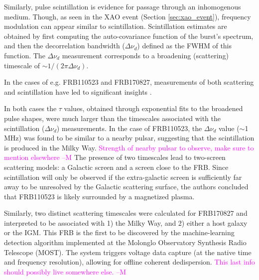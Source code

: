 \documentclass[a4paper,fleqn,usenatbib]{mnras}
\newcommand{\cM}[1]{\textcolor{magenta}{ #1 --M}}
\begin{document}
Similarly, pulse scintillation is evidence for passage through an inhomogenous medium. Though, as seen
in the XAO event (Section \ref{sec:xao_event}), frequency modulation can appear similar to scintillation. Scintillation estimates are obtained by first computing the auto-covariance function of the burst's spectrum, and then the  decorrelation bandwidth ($\Delta \nu_d$) defined as the FWHM of this function. The $\Delta \nu_d$ measurement corresponds to a broadening (scattering) timescale of $\sim 1/(2\pi\Delta \nu_d)$.

In the cases of e.g. FRB110523 and FRB170827, measurements of both scattering and scintillation have led to significant insights \citep{2015Natur.528..523M,2018arXiv180305697F}. 

In both cases the $\tau$ values, obtained through exponential fits to the broadened pulse shapes, were much larger than the timescales associated with the scintillation ($\Delta\nu_d$) measurements. In the case of FRB110523, the $\Delta\nu_d$ value ($\sim$1 MHz) was found to be similar to a nearby pulsar, suggesting that the scintillation is produced in the Milky Way. \cM{Strength of nearby pulsar to observe, make sure to mention elsewhere} The presence of two timescales lead to two-screen scattering models: a Galactic screen and a screen close to the FRB. Since scintillation will only be observed if the extra-galactic screen is sufficiently far away to be unresolved by the Galactic scattering surface, the authors concluded that FRB110523 is likely surrounded by a magnetized plasma. 

Similarly, two distinct scattering timescales were calculated for FRB170827 and interpreted to be associated with 1) the Milky Way, and 2) either a host galaxy or the IGM. This FRB is the first to be discovered by the machine-learning detection algorithm implemented at the Molonglo Observatory Synthesis Radio Telescope (MOST). The system triggers voltage data capture (at the native time and frequency resolution), allowing for offline coherent dedispersion. \cM{This last info should possibly live somewhere else.}







\end{document}
